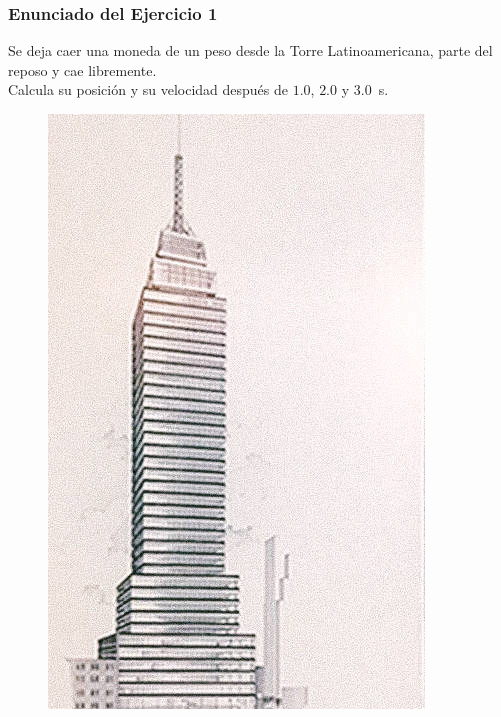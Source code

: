 \documentclass[14pt]{beamer}
\begin{document}
\begin{frame}
\frametitle{Enunciado del Ejercicio 1}
Se deja caer una moneda de un peso desde la Torre Latinoamericana, parte del reposo y cae libremente.
\\
\bigskip
\pause
Calcula su posición y su velocidad después de $1.0$, $2.0$ y \SI{3.0}{\second}.
\end{frame}
\begin{frame}[plain]
\begin{figure}
\centering
\includegraphics[scale=1.2]{Imagenes/Torre_Latino.jpg}
\end{figure}
\end{frame}
\end{document}
